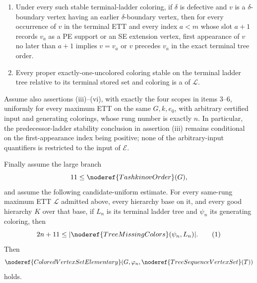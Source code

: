 \begin{theorem}
\begin{enumerate}
defective color are \(v,\gamma,\delta\), the
\(\gamma\)-\(\delta\) component through \(v\), under every proper
exactly-one-uncolored coloring stable on the terminal ladder tree relative
to the terminal stored set and coloring, meets that ladder tree precisely
at \(v\).
\item Under every such stable terminal-ladder coloring, if \(\delta\) is
defective and \(v\) is a \(\delta\)-boundary vertex having an earlier
\(\delta\)-boundary vertex, then for every occurrence of \(v\) in the
terminal ETT and every index \(a<m\) whose slot \(a+1\) records \(v_a\) as
a PE support or an SE extension vertex, first appearance of \(v\) no later
than \(a+1\) implies \(v=v_a\) or \(v\) precedes \(v_a\) in the exact
terminal tree order.
\item Every proper exactly-one-uncolored coloring stable on the terminal
ladder tree relative to its terminal stored set and coloring is a
 of \(\mathcal L\).
\end{enumerate}

Assume also assertions (iii)--(vi), with exactly the four scopes in items
3--6, uniformly for every maximum ETT on the same \(G,k,e_0\), with
arbitrary certified input and generating colorings, whose rung number is
exactly \(n\).  In particular, the predecessor-ladder stability conclusion
in assertion (iii) remains conditional on the first-appearance index being
positive; none of the arbitrary-input quantifiers is restricted to the
input of \(\mathcal E\).

Finally assume the large branch
\[
                         11\leq \noderef{TashkinovOrder}(G),
\]
and assume the following candidate-uniform estimate.  For every same-rung
maximum ETT \(\mathcal L\) admitted above, every hierarchy base on it, and
every good hierarchy \(K\) over that base, if \(L_n\) is its terminal
ladder tree and \(\psi_n\) its generating coloring, then
\[
             2n+11\leq
             |\noderef{TreeMissingColors}(\psi_n,L_n)|.       \tag{1}
\]
Then
\[
       \noderef{ColoredVertexSetElementary}
          (G,\varphi_n,\noderef{TreeSequenceVertexSet}(T))
\]
holds.
\end{theorem}
